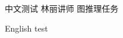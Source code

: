 \documentclass[fontset=fandol]{ctexart}
\begin{document}
中文测试 林丽讲师 图推理任务\par English test
\end{document}
